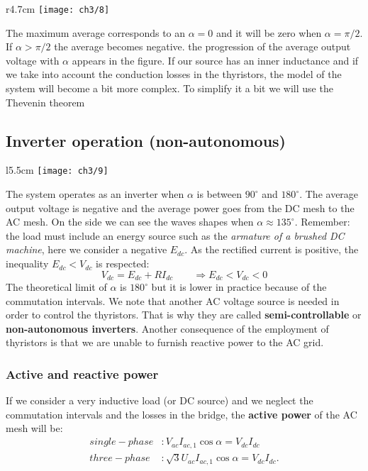 					\begin{wrapfigure}[7]{r}{4.7cm}
					\vspace{-5mm}
					\texttt{[image: ch3/8]}
					\end{wrapfigure}
					The maximum average corresponds to an $\alpha = 0$ and it will be zero when $\alpha = \pi /2$. If $\alpha > \pi /2$ the average becomes negative. the progression of the average output voltage with $\alpha$ appears in the figure.
					If our source has an inner inductance and if we take into account the conduction losses in the thyristors, the model of the system will become a bit more complex. To simplify it a bit we will use the Thevenin theorem
					
					\newpage
					
			\subsection{Inverter operation (non-autonomous)}
				\begin{wrapfigure}[13]{l}{5.5cm}
				\vspace{-5mm}
				\texttt{[image: ch3/9]}
				\end{wrapfigure}
				The system operates as an inverter when $\alpha$ is between $90^\circ$ and $180^\circ$. The average output voltage is negative and the average power goes from the DC mesh to the AC mesh. On the side we can see the waves shapes when $\alpha \approx 135^\circ$. Remember: the load must include an energy source such as the \textit{armature of a brushed DC machine}, here we consider a negative $E_{dc}$. As the rectified current is positive, the inequality $E_{dc}<V_{dc}$ is respected:
				\begin{equation}
					V_{dc} = E_{dc} + RI_{dc} \qquad \Rightarrow E_{dc} < V_{dc} < 0 
				\end{equation}
				The theoretical limit of $\alpha$ is $180^\circ$ but it is lower in practice because of the commutation intervals. We note that another AC voltage source is needed in order to control the thyristors. That is why they are called \textbf{semi-controllable} or \textbf{non-autonomous inverters}. Another consequence of the  employment of thyristors is that we are unable to furnish reactive power to the AC grid. 
				
					\subsubsection{Active and reactive power}
						If we consider a very inductive load (or DC source) and we neglect the commutation intervals and the losses in the bridge, the \textbf{active power} of the AC mesh will be:
						\begin{equation}
						\begin{aligned}
						single-phase &: V_{ac}I_{ac,1}\cos \alpha = V_{dc}I_{dc}\\
						three-phase &: \sqrt{3}U_{ac}I_{ac,1}\cos \alpha = V_{dc}I_{dc}.
						\end{aligned}
						\end{equation}

